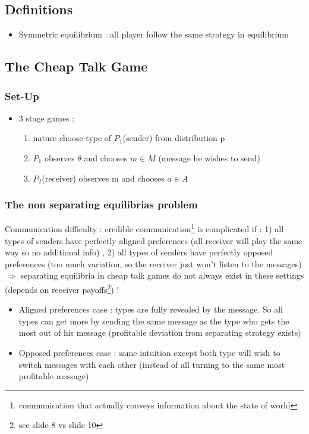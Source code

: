 \documentclass{article}
\begin{document}
\subsection{Definitions}
\begin{itemize}
    \item Symmetric equilibrium : all player follow the same strategy in equilibrium
\end{itemize}

\subsection{The Cheap Talk Game}
\subsubsection{Set-Up}
\begin{itemize}
    \item 3 stage games : 
    \begin{enumerate}
        \item nature choose type of $P_1$(sender) from distribution p
        \item $P_1$ observes $\theta$ and chooses $m\in M$ (message he wishes to send)
        \item $P_2$(receiver) observes m and chooses $a\in A$
    \end{enumerate}
\end{itemize}
\subsubsection{The non separating equilibrias problem}
Communication difficulty : credible communication\footnote{communication that actually conveys information about the state of world} is complicated if : 1) all types of senders have perfectly aligned preferences (all receiver will play the same way so no additional info) , 2) all types of senders have perfectly opposed preferences (too much variation, so the receiver just won't listen to the messages)
$\Rightarrow$ separating equilibria in cheap talk games do not always exist in these settings (depends on receiver payoffs\footnote{see slide 8 vs slide 10}) !
\begin{Proof}
    \begin{itemize}
        \item Aligned preferences case : types are fully revealed by the message. So all types can get more by sending the same message as the type who gets the most out of his message (profitable deviation from separating strategy exists)
        \item Opposed preferences case  : same intuition except both type will wish to switch messages with each other (instead of all turning to the same most profitable message)
    \end{itemize}
\end{Proof}
\end{document}
